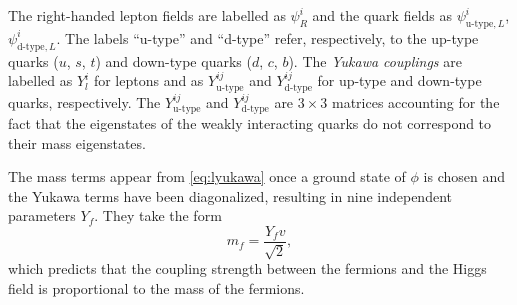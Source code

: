 The right-handed lepton fields are labelled as $\psi_R^i$ and the quark fields as $\psi^{i}_{\text{u-type},L}$, $\psi^{i}_{\text{d-type},L}$.
The labels ``u-type'' and ``d-type'' refer, respectively, to the up-type quarks ($u$, $s$, $t$) and down-type quarks ($d$, $c$, $b$).
The \emph{Yukawa couplings} are labelled as $Y_l^i$ for leptons and as $Y_{\text{u-type}}^{ij}$ and $Y_{\text{d-type}}^{ij}$ for up-type and down-type quarks, respectively. The $Y_{\text{u-type}}^{ij}$ and $Y_{\text{d-type}}^{ij}$ are $3 \times 3$ matrices accounting for the fact that the eigenstates of the weakly interacting quarks do not correspond to their mass eigenstates.

The mass terms appear from \cref{eq:lyukawa} once a ground state of $\phi$ is chosen and the Yukawa terms have been diagonalized, resulting in nine independent parameters $Y_f$.
They take the form
\begin{equation}
  m_f = \frac{Y_f v}{\sqrt{2}},
\end{equation}
which predicts that the coupling strength between the fermions and the Higgs field is proportional to the mass of the fermions.


